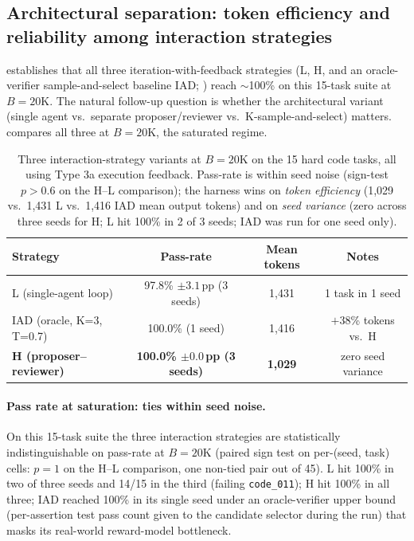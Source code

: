 \documentclass[11pt]{article}
\begin{document}
\subsection{Architectural separation: token efficiency and reliability among interaction strategies}
\label{sec:harness-separation}

 establishes that all three iteration-with-feedback strategies (L, H, and an oracle-verifier sample-and-select baseline IAD; \citealp{ruan2025iad}) reach $\sim$100\% on this 15-task suite at $B{=}20$K. The natural follow-up question is whether the architectural variant (single agent vs.\ separate proposer/reviewer vs.\ K-sample-and-select) matters.  compares all three at $B{=}20$K, the saturated regime.

\begin{table}[ht]
\centering
\caption{Three interaction-strategy variants at $B{=}20$K on the 15 hard code tasks, all using Type 3a execution feedback. Pass-rate is within seed noise (sign-test $p{>}0.6$ on the H--L comparison); the harness wins on \emph{token efficiency} (1{,}029 vs.\ 1{,}431 L vs.\ 1{,}416 IAD mean output tokens) and on \emph{seed variance} (zero across three seeds for H; L hit 100\% in 2 of 3 seeds; IAD was run for one seed only).}
\label{tab:LvsH}
\small
\begin{tabular}{lccc}
\toprule
Strategy & Pass-rate & Mean tokens & Notes \\
\midrule
L (single-agent loop)              & 97.8\% $\pm 3.1$\,pp (3 seeds)           & 1{,}431          & 1 task in 1 seed \\
IAD (oracle, K=3, T=0.7)           & 100.0\% (1 seed)                         & 1{,}416          & $+38$\% tokens vs.\ H \\
\textbf{H (proposer--reviewer)}    & \textbf{100.0\% $\pm 0.0$\,pp (3 seeds)} & \textbf{1{,}029} & zero seed variance \\
\bottomrule
\end{tabular}
\end{table}

\paragraph{Pass rate at saturation: ties within seed noise.} On this 15-task suite the three interaction strategies are statistically indistinguishable on pass-rate at $B{=}20$K (paired sign test on per-(seed, task) cells: $p{=}1$ on the H--L comparison, one non-tied pair out of 45). L hit 100\% in two of three seeds and 14/15 in the third (failing \texttt{code\_011}); H hit 100\% in all three; IAD reached 100\% in its single seed under an oracle-verifier upper bound (per-assertion test pass count given to the candidate selector during the run) that masks its real-world reward-model bottleneck.
\end{document}
